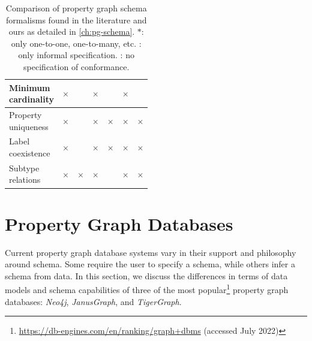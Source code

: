 \documentclass{report}
\theoremstyle{definition}
\newcommand{\yes}{\cellcolor{lightgreen}\color{green}\checkmark}
\newcommand{\no}{\cellcolor{lightred}\color{red}$\times$}
\begin{document}
\begin{table}[t]
\begin{tabular}{lcccccc}
    \hline
    \makecell[l]{Minimum                                                                                                                                                                        \\cardinality}     & \no                & \yes                 & \no                 & \yes*                 & \no          & \yes \\
    \hline
    \makecell[l]{Property                                                                                                                                                                       \\uniqueness}    & \no               & \yes                & \no                 & \no                & \no           & \no \\
    \hline
    \makecell[l]{Label                                                                                                                                                                          \\coexistence} & \no                & \yes                & \no                 & \no                 & \no           & \no \\
    \hline
    \makecell[l]{Subtype                                                                                                                                                                        \\relations} & \no                & \no                 & \no                 & \yes                 & \no           & \no \\
    \hline
  \end{tabular}
  \caption[Comparison of property graph schema formalisms found in the literature and ours]{Comparison of property graph schema formalisms found in the literature and ours as detailed in \autoref{ch:pg-schema}. $*$: only one-to-one, one-to-many, etc. \textdagger: only informal specification. {\footnotesize \textdaggerdbl}: no specification of conformance.}
  \label{tab:pg-schema-literature}
\end{table}

\section{Property Graph Databases}

Current property graph database systems vary in their support and philosophy around schema. Some require the user to specify a schema, while others infer a schema from data. In this section, we discuss the differences in terms of data models and schema capabilities of three of the most popular\footnote{\url{https://db-engines.com/en/ranking/graph+dbms} (accessed July 2022)} property graph databases: \emph{Neo4j}, \emph{JanusGraph}, and \emph{TigerGraph}.
\end{document}
